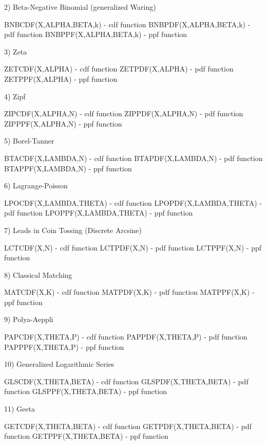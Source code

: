 {        2) Beta-Negative Binomial (generalized Waring)
 
           BNBCDF(X,ALPHA,BETA,k)       - cdf function
           BNBPDF(X,ALPHA,BETA,k)       - pdf function
           BNBPPF(X,ALPHA,BETA,k)       - ppf function
 
        3) Zeta
 
           ZETCDF(X,ALPHA)              - cdf function
           ZETPDF(X,ALPHA)              - pdf function
           ZETPPF(X,ALPHA)              - ppf function
 
        4) Zipf
 
           ZIPCDF(X,ALPHA,N)            - cdf function
           ZIPPDF(X,ALPHA,N)            - pdf function
           ZIPPPF(X,ALPHA,N)            - ppf function
 
        5) Borel-Tanner
 
           BTACDF(X,LAMBDA,N)           - cdf function
           BTAPDF(X,LAMBDA,N)           - pdf function
           BTAPPF(X,LAMBDA,N)           - ppf function
 
        6) Lagrange-Poisson
 
           LPOCDF(X,LAMBDA,THETA)       - cdf function
           LPOPDF(X,LAMBDA,THETA)       - pdf function
           LPOPPF(X,LAMBDA,THETA)       - ppf function
 
        7) Leads in Coin Tossing (Discrete Arcsine)
 
           LCTCDF(X,N)                  - cdf function
           LCTPDF(X,N)                  - pdf function
           LCTPPF(X,N)                  - ppf function

        8) Classical Matching
 
           MATCDF(X,K)                  - cdf function
           MATPDF(X,K)                  - pdf function
           MATPPF(X,K)                  - ppf function

        9) Polya-Aeppli

           PAPCDF(X,THETA,P)            - cdf function
           PAPPDF(X,THETA,P)            - pdf function
           PAPPPF(X,THETA,P)            - ppf function
 
       10) Generalized Logarithmic Series

           GLSCDF(X,THETA,BETA)         - cdf function
           GLSPDF(X,THETA,BETA)         - pdf function
           GLSPPF(X,THETA,BETA)         - ppf function
 
       11) Geeta

           GETCDF(X,THETA,BETA)         - cdf function
           GETPDF(X,THETA,BETA)         - pdf function
           GETPPF(X,THETA,BETA)         - ppf function
 
}
